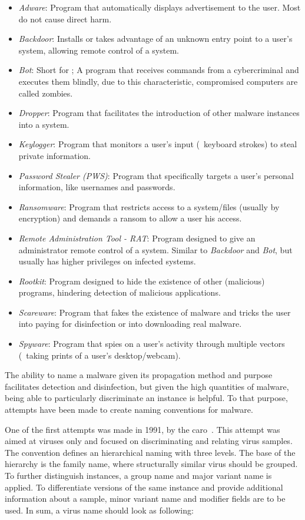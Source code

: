\begin{itemize}
	\item \textit{Adware}: Program that automatically displays advertisement to the user. Most do not cause direct harm.
	\item \textit{Backdoor}: Installs or takes advantage of an unknown entry point to a user's system, allowing remote control of a system.
	\item \textit{Bot}: Short for ; A program that receives commands from a cybercriminal and executes them blindly, due to this characteristic, compromised computers are called zombies.
	\item \textit{Dropper}: Program that facilitates the introduction of other malware instances into a system.
	\item \textit{Keylogger}: Program that monitors a user's input (\eg\ keyboard strokes) to steal private information.
	\item \textit{Password Stealer (PWS)}: Program that specifically targets a user's personal information, like usernames and passwords.
	\item \textit{Ransomware}: Program that restricts access to a system/files (usually by encryption) and demands a ransom to allow a user his access.
	\item \textit{Remote Administration Tool - RAT}: Program designed to give an administrator remote control of a system. Similar to \textit{Backdoor} and \textit{Bot}, but usually has higher privileges on infected systems.
	\item \textit{Rootkit}: Program designed to hide the existence of other (malicious) programs, hindering detection of malicious applications.
	\item \textit{Scareware}: Program that fakes the existence of malware and tricks the user into paying for disinfection or into downloading real malware.
	\item \textit{Spyware}: Program that spies on a user's activity through multiple vectors (\eg\ taking prints of a user's desktop/webcam).
\end{itemize}

The ability to name a malware given its propagation method and purpose facilitates detection and disinfection, but given the high quantities of malware, being able to particularly discriminate an instance is helpful.
To that purpose, attempts have been made to create naming conventions for malware.

One of the first attempts was made in 1991, by the \gls{caro}~\cite{caro:naming}.
This attempt was aimed at viruses only and focused on discriminating and relating virus samples.
The convention defines an hierarchical naming with three levels.
The base of the hierarchy is the family name, where structurally similar virus should be grouped.
To further distinguish instances, a group name and major variant name is applied.
To differentiate versions of the same instance and provide additional information about a sample, minor variant name and modifier fields are to be used.
In sum, a virus name should look as following:

